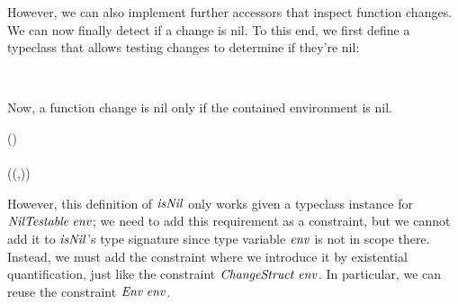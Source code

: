 However, we can also implement further accessors that inspect function changes.
We can now finally detect if a change is nil. To this end, we first define a
typeclass that allows testing changes to determine if they're nil:
\begin{hscode}\SaveRestoreHook
{}%
%
%
\>[B]{}\;\;\Rightarrow{}\;\;\<[E]%
\\
\>[B]{}\<[3]%
\>[3]{}\mathrel{:\mkern-1mu:}\Delta {}\to {}\<[E]%
\ColumnHook
\end{hscode}\resethooks
Now, a function change is nil only if the contained environment is nil.
\begin{hscode}\SaveRestoreHook
{}%
%
%
\>[B]{}\;\;(\;\sigma\;\tau)\;\<[E]%
\\
\>[B]{}\<[3]%
\>[3]{}\mathrel{:\mkern-1mu:}\;\sigma\;\tau\to {}\<[E]%
\\
\>[B]{}\<[3]%
\>[3]{}\;(\;(,))\mathrel{=}\;\<[E]%
\ColumnHook
\end{hscode}\resethooks
However, this definition of \ensuremath{\Varid{isNil}} only works given a typeclass instance for
\ensuremath{\Conid{NilTestable}\;\Varid{env}}; we need to add this requirement as a constraint, but we
cannot add it to \ensuremath{\Varid{isNil}}'s type signature since type variable \ensuremath{\Varid{env}} is not in
scope there.
Instead, we must add the constraint where we introduce it by existential
quantification, just like the constraint \ensuremath{\Conid{ChangeStruct}\;\Varid{env}}. In particular, we
can reuse the constraint \ensuremath{\Conid{Env}\;\Varid{env}}.
